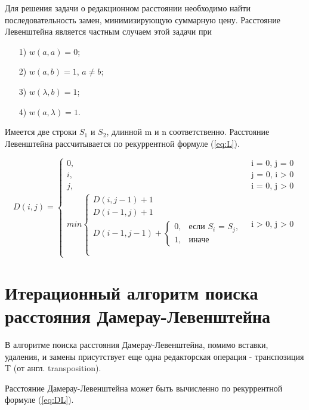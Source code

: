 \documentclass[a4paper,14pt, unknownkeysallowed]{extreport}
\begin{document}
Для решения задачи о редакционном расстоянии необходимо найти последовательность замен, минимизирующую суммарную цену. 
Расстояние Левенштейна является частным случаем этой задачи при

\begin{itemize}
	\item[1)] $w(a, a) = 0$;
	\item[2)] $w(a, b) = 1$, $a \neq b$;
	\item[3)] $w(\lambda, b) = 1$;
	\item[4)] $w(a, \lambda) = 1$.
\end{itemize}

Имеется две строки $S_{1}$ и $S_{2}$, длинной m и n соответственно. 
Расстояние Левенштейна рассчитывается по рекуррентной формуле (\ref{eq:L}).

\begin{equation}
	\label{eq:L}
	D(i, j) = \begin{cases}
	0, &\text{i = 0, j = 0}\\
	i, &\text{j = 0, i > 0}\\
	j, &\text{i = 0, j > 0}\\
	min \begin{cases}
		D(i, j - 1) + 1\\
		D(i - 1, j) + 1\\
		D(i - 1, j - 1) + \begin{cases}
                        		0, &\text{если $S_{i}$ = $S_{j}$,}\\
                        		1, &\text{иначе}
                        	\end{cases}\\\\
	\end{cases}
	&\text{i > 0, j > 0}
	\end{cases}
\end{equation}

\section{Итерационный алгоритм поиска расстояния Дамерау-Левенштейна}

В алгоритме поиска расстояния Дамерау-Левенштейна, помимо вставки, удаления, и замены присутствует  еще одна редакторская операция - транспозиция T (от англ. transposition).

Расстояние Дамерау-Левенштейна может быть вычисленно по рекуррентной формуле (\ref{eq:DL}).
\end{document}
